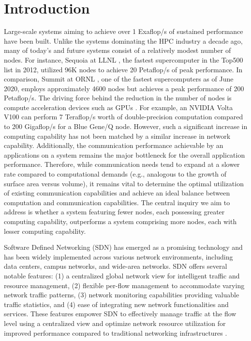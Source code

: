 \chapter{Introduction}

Large-scale systems aiming to achieve over 1 Exaflop/s of sustained performance have been built. Unlike the systems dominating the HPC industry
a decade ago, many of today's and future systems consist of a relatively modest
number of nodes. For instance, Sequoia at LLNL \cite{sequa}, the fastest supercomputer in
the Top500 list in 2012, utilized 96K nodes to achieve 20 Petaflop/s of peak
performance. In comparison, Summit at ORNL \cite{summit}, one of the fastest
supercomputers as of June 2020, employs approximately 4600 nodes but achieves a
peak performance of 200 Petaflop/s. The driving force behind the reduction in the
number of nodes is compute acceleration devices such as GPUs \cite{owens2008gpu}. For example,
an NVIDIA Volta V100 can perform 7 Teraflop/s worth of double-precision
computation compared to 200 Gigaflop/s for a Blue Gene/Q node. However, such a
significant increase in computing capability has not been matched by a similar
increase in network capability. Additionally, the communication performance
achievable by an applications on a system remains the major bottleneck for the overall 
application performance.  Therefore, while communication needs tend to expand at a slower
rate compared to computational demands (e.g., analogous to the growth of surface
area versus volume), it remains vital to determine the optimal utilization of
existing communication capabilities and achieve an ideal balance between
computation and communication capabilities.  The central inquiry we aim to
address is whether a system featuring fewer nodes, each possessing greater
computing capability, outperforms a system comprising more nodes, each with
lesser computing capability. 


Software Defined Networking (SDN) \cite{kreutz2014software} has emerged as a promising technology and
has been widely implemented across various network environments, including data
centers, campus networks, and wide-area networks. SDN offers several notable
features: (1) a centralized global network view for intelligent traffic and
resource management, (2) flexible per-flow management to accommodate varying
network traffic patterns, (3) network monitoring capabilities providing valuable
traffic statistics, and (4) ease of integrating new network functionalities and
services. These features empower SDN to effectively manage traffic at the flow
level using a centralized view and optimize network resource utilization for
improved performance compared to traditional networking infrastructures \cite{tr2016sdn}.

